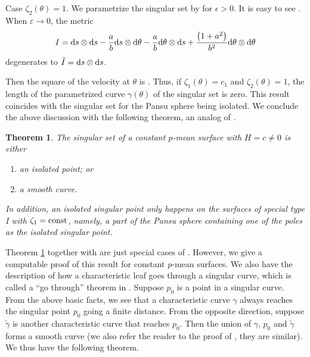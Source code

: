 \documentclass[10pt,a4paper]{amsart}
\numberwithin{equation}{section}
\newtheorem{Theorem}{Theorem}[section]
\begin{document}
Case $\zeta _{2}(\theta ) =1$. We parametrize the singular set by  for $\epsilon >0$. It is easy to see
.
When $\varepsilon \rightarrow 0$, the metric
\[
I={\rm d}s\otimes {\rm d}s-\frac{a}{b}{\rm d}s\otimes {\rm d}\theta -\frac{a}{b}{\rm d}\theta \otimes {\rm d}s+
\frac{\bigl( 1+a^{2}\bigr) }{b^{2}}{\rm d}\theta \otimes {\rm d}\theta
\]
degenerates to
$\tilde{I}={\rm d}s\otimes {\rm d}s$.


Then the square of the velocity at $\theta $ is
.
Thus, if $\zeta _{1}( \theta ) =c_{1}$ and $\zeta _{2}( \theta
) =1$, the length of the parametrized curve $\gamma (\theta )$ of
the singular set is zero. This result coincides with the singular set for the Pansu sphere being isolated.
We conclude the above discussion with the following theorem, an analog of \cite[Theorem 1.7]{ChiuH/LiuH:2022}.

\begin{Theorem}\label{strofsiset}
The singular set of a constant $p$-mean surface with $H=c\neq 0$ is either
\begin{enumerate}\itemsep=0pt
\item[$(1)$] an isolated point; or
\item[$(2)$] a smooth curve.
\end{enumerate}
In addition, an isolated singular point only happens on the surfaces of special type I with $\zeta_{1}=\text{\rm const}$, namely, a part of the Pansu sphere containing one of the poles as the isolated singular point.
\end{Theorem}
Theorem \ref{strofsiset} together with \cite[Theorem 1.7]{ChiuH/LiuH:2022} are just special cases of \cite[Theorem 3.3]{ChengJ/HwangJ/MalchiodiA/YangP:2005}. However, we give a computable proof of this result for constant $p$-mean surfaces. We also have the description of how a characteristic leaf goes through a singular curve, which is called a ``go through'' theorem in \cite{ChengJ/HwangJ/MalchiodiA/YangP:2005}. Suppose $p_{0}$ is a point in a singular curve. From the above basic facts, we see that a characteristic curve $\gamma$ always reaches the singular point $p_{0}$ going a finite distance. From the opposite direction, suppose $\tilde{\gamma}$ is another characteristic curve that reaches $p_{0}$. Then the union of $\gamma$, $p_{0}$ and $\tilde{\gamma}$ forms a smooth curve (we also refer the reader to the proof of \cite[Theorem~1.8]{ChiuH/LiuH:2022}, they are similar). We thus have the following theorem.
\end{document}
